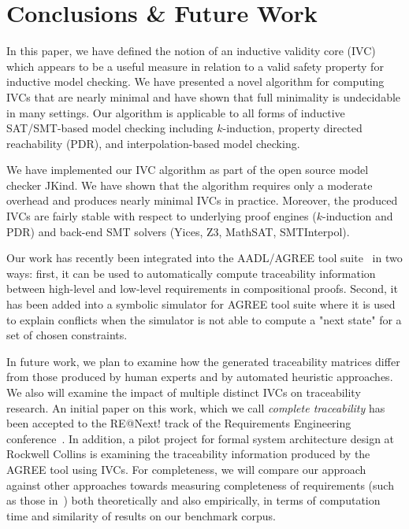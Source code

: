 \section{Conclusions \& Future Work}
\label{sec:conc}

In this paper, we have defined the notion of an inductive validity core (IVC) which
appears to be a useful measure in relation to a valid safety property
for inductive model checking. We have presented a novel algorithm for
computing IVCs that are nearly minimal and have shown that full
minimality is undecidable in many settings. Our algorithm is
applicable to all forms of inductive SAT/SMT-based model checking
including $k$-induction, property directed reachability (PDR), and
interpolation-based model checking.

We have implemented our IVC algorithm as part of the open source model
checker JKind. We have shown that the algorithm requires only a
moderate overhead and produces nearly minimal IVCs in practice.
Moreover, the produced IVCs are fairly stable with respect to
underlying proof engines ($k$-induction and PDR) and back-end SMT
solvers (Yices, Z3, MathSAT, SMTInterpol).

Our work has recently been integrated into the AADL/AGREE tool suite~\cite{QFCS15:backes,hilt2013} in two ways: first, it can be used to automatically compute traceability information between high-level and low-level requirements in compositional proofs.  Second, it has been added into a symbolic simulator for AGREE tool suite where it is used to explain conflicts when the simulator is not able to compute a "next state" for a set of chosen constraints.  

In future work, we plan to examine how the generated traceability matrices differ from those produced by human experts and by automated heuristic approaches. We also will examine the impact of multiple distinct IVCs on traceability research.  An initial paper on this work, which we call {\em complete traceability} has been accepted to the RE@Next! track of the Requirements Engineering conference~\cite{Murugesan16:renext}.  In addition, a pilot project for formal system architecture design at Rockwell Collins is examining the traceability information produced by the AGREE tool using IVCs.  For completeness, we will compare our approach against other approaches towards measuring completeness of requirements (such as those in~\cite{chockler_coverage_2003, Kupferman:2006:SCF, kupferman_theory_2008}) both theoretically and also empirically, in terms of computation time and similarity of results on our benchmark corpus.

